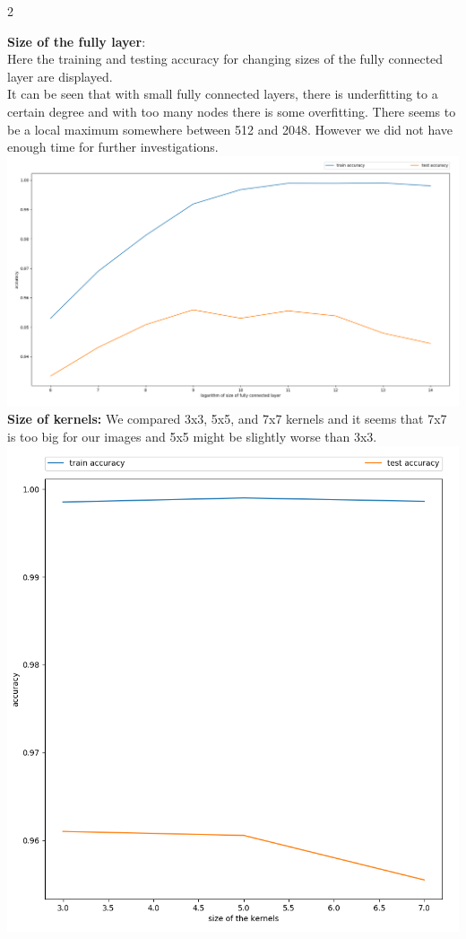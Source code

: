 \documentclass{article}
\begin{document}
\begin{ukon-infie}[3.12.17]{2}
\begin{exercise}[p=55]{}
{			\textbf{Size of the fully layer}:\\
			Here the training and testing accuracy for changing sizes of the fully connected layer are displayed. \\
			It can be seen that with small fully connected layers, there is underfitting to a certain degree and with too many nodes there is some overfitting. There seems to be a local maximum somewhere between 512 and 2048. However we did not have enough time for further investigations.\\
			\includegraphics[scale=1.1]{convsize.png}\\
			
			
			\textbf{Size of kernels:} 
			We compared 3x3, 5x5, and 7x7 kernels and it seems that 7x7 is too big for our images and 5x5 might be slightly worse than 3x3.\\
			\includegraphics[scale=1.1]{kernelsize.png}\\
			

}
\end{exercise}
\end{ukon-infie}
\end{document}
